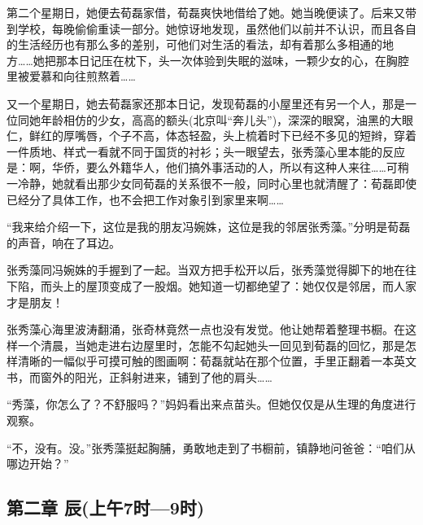 \par 第二个星期日，她便去荀磊家借，荀磊爽快地借给了她。她当晚便读了。后来又带到学校，每晚偷偷重读一部分。她惊讶地发现，虽然他们以前并不认识，而且各自的生活经历也有那么多的差别，可他们对生活的看法，却有着那么多相通的地方……她把那本日记压在枕下，头一次体验到失眠的滋味，一颗少女的心，在胸腔里被爱慕和向往煎熬着……
\par 又一个星期日，她去荀磊家还那本日记，发现荀磊的小屋里还有另一个人，那是一位同她年龄相仿的少女，高高的额头(北京叫“奔儿头”)，深深的眼窝，油黑的大眼仁，鲜红的厚嘴唇，个子不高，体态轻盈，头上梳着时下已经不多见的短辫，穿着一件质地、样式一看就不同于国货的衬衫；头一眼望去，张秀藻心里本能的反应是：啊，华侨，要么外籍华人，他们搞外事活动的人，所以有这种人来往……可稍一冷静，她就看出那少女同荀磊的关系很不一般，同时心里也就清醒了：荀磊即使已经分了具体工作，也不会把工作对象引到家里来啊……
\par “我来给介绍一下，这位是我的朋友冯婉姝，这位是我的邻居张秀藻。”分明是荀磊的声音，响在了耳边。
\par 张秀藻同冯婉姝的手握到了一起。当双方把手松开以后，张秀藻觉得脚下的地在往下陷，而头上的屋顶变成了一股烟。她知道一切都绝望了：她仅仅是邻居，而人家才是朋友！
\par 张秀藻心海里波涛翻涌，张奇林竟然一点也没有发觉。他让她帮着整理书橱。在这样一个清晨，当她走进右边屋里时，怎能不勾起她头一回见到荀磊的回忆，那是怎样清晰的一幅似乎可摸可触的图画啊：荀磊就站在那个位置，手里正翻着一本英文书，而窗外的阳光，正斜射进来，铺到了他的肩头……
\par “秀藻，你怎么了？不舒服吗？”妈妈看出来点苗头。但她仅仅是从生理的角度进行观察。
\par “不，没有。没。”张秀藻挺起胸脯，勇敢地走到了书橱前，镇静地问爸爸：“咱们从哪边开始？”




\subsection*{第二章 辰(上午7时—9时)}

